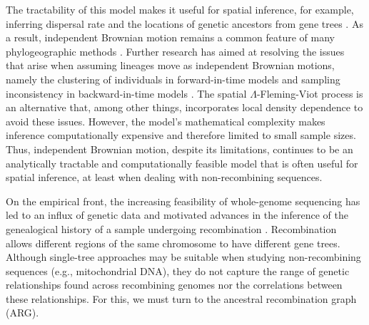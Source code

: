 The tractability of this model makes it useful for spatial inference, for example, inferring dispersal rate and the locations of genetic ancestors from gene trees \citep[e.g.,][]{lemmon2008likelihood,Novembre2009}.
As a result, independent Brownian motion remains a common feature of many phylogeographic methods \citep[e.g.,][]{dellicour2021relax}.
Further research has aimed at resolving the issues that arise when assuming lineages move as independent Brownian motions, namely the clustering of individuals in forward-in-time models \citep{Felsenstein1975} and sampling inconsistency in backward-in-time models \citep{barton2010new}. The spatial $\Lambda$-Fleming-Viot process \citep{barton2010new,Barton2013,barton2010newEvol} is an alternative that, among other things, incorporates local density dependence to avoid these issues. However, the model's mathematical complexity makes inference computationally expensive \citep{Wirtz2023} and therefore limited to small sample sizes. Thus, independent Brownian motion, despite its limitations, continues to be an analytically tractable and computationally feasible model that is often useful for spatial inference, at least when dealing with non-recombining sequences.

On the empirical front, the increasing feasibility of whole-genome sequencing has led to an influx of genetic data and motivated advances in the inference of the genealogical history of a sample undergoing recombination \citep[e.g.,][]{Rasmussen2014,speidel2019method,kelleher2019inferring,schaefer2021ancestral,Wohns2022,Deng2024}. Recombination allows different regions of the same chromosome to have different gene trees. Although single-tree approaches may be suitable when studying non-recombining sequences (e.g., mitochondrial DNA), they do not capture the range of genetic relationships found across recombining genomes nor the correlations between these relationships. For this, we must turn to the ancestral recombination graph (ARG).


